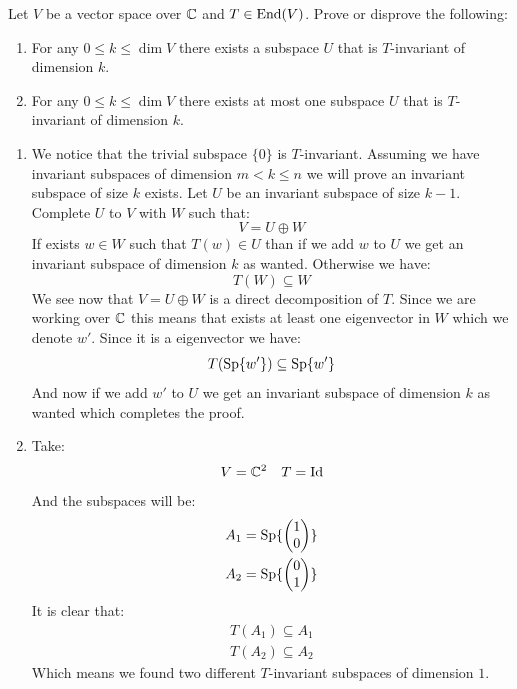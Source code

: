 \documentclass[11pt, a4paper]{article}
\begin{document}
\begin{exercise}
  Let $V$ be a vector space over $\mathbb{C}$ and $T\in\operatorname{End}(V)$.
  Prove or disprove the following:
  \begin{enumerate}
    \item[(1)] For any $0 \le k \le \dim V$ there exists a subspace $U$
      that is $T$-invariant of dimension $k$.
    \item[(2)] For any $0 \le k \le \dim V$ there exists at most one subspace 
      $U$ that is $T$-invariant of dimension $k$.
  \end{enumerate}
\end{exercise}
\begin{solution} \phantom{}
\begin{enumerate}
  \item[(1)]
  We notice that the trivial subspace $\{0\}$ is $T$-invariant. Assuming
  we have invariant subspaces of dimension $m < k \le n$ we will prove
  an invariant subspace of size $k$ exists. Let $U$ be an invariant subspace
  of size $k-1$. Complete $U$ to $V$ with $W$ such that:
  \[
    V = U \oplus W
  \]
  If exists $w \in W$ such that $T(w) \in U$ than if we add $w$ to $U$
  we get an invariant subspace of dimension $k$ as wanted. Otherwise
  we have:
  \[
    T(W) \subseteq W
  \]
  We see now that $V = U \oplus W$ is a direct decomposition of $T$. Since
  we are working over $\mathbb{C}$ this means that exists at least one eigenvector
  in $W$ which we denote $w'$. Since it is a eigenvector we have:
  \[
    T(\mathrm{Sp}\{w'\}) \subseteq \mathrm{Sp}\{w'\}
  \]
  And now if we add $w'$ to $U$ we get an invariant subspace of dimension 
  $k$ as wanted which completes the proof.
\item[(2)]
  Take:
  \[
    V = \mathbb{C}^2 \quad T = \mathrm{Id}
  \]
  And the subspaces will be:
  \begin{align*}
    A_1 &= \mathrm{Sp} \{\begin{pmatrix} 1 \\ 0\end{pmatrix}\}  \\
    A_2 &= \mathrm{Sp} \{\begin{pmatrix} 0 \\ 1\end{pmatrix}\}
  \end{align*}
  It is clear that:
  \begin{align*}
    T(A_1) \subseteq A_1 \\
    T(A_2) \subseteq A_2 
  \end{align*}
  Which means we found two different $T$-invariant subspaces of dimension $1$.
\end{enumerate}
\end{solution}
\end{document}
